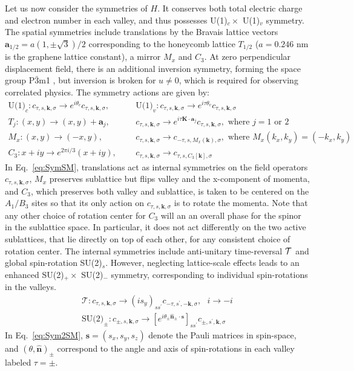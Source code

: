 \documentclass[aps,pra,twocolumn,superscriptaddress,10pt,article,nofootinbib,showpacs,longbibliography]{revtex4-1}
\def \k{{\mathbf k}}
\def \n{{\mathbf n}}
\def \s{{\mathbf s}}
\def \K{{\mathbf K}}
\def \beq{\begin{eqnarray}}
\def \eeq{\end{eqnarray}}
\def \nn{\nonumber \\}
\begin{document}
Let us now consider the symmetries of $H$. It conserves both total electric charge and electron number in each valley, and thus possesses U(1)$_c \times$ U(1)$_v$ symmetry.
The spatial symmetries include translations by the Bravais lattice vectors $\bm{a}_{1/2} = a(1, \pm \sqrt{3})/2$ corresponding to the honeycomb lattice $T_{1/2}$ ($a = 0.246$ nm is the graphene lattice constant), a mirror $M_x$ and $C_3$. 
At zero perpendicular displacement field, there is an additional inversion symmetry, forming the space group P$\bar{3}$m1 \cite{Latil,Cvetkovic}, but inversion is broken for $u \neq 0$, which is required for observing correlated physics. 
The symmetry actions are given by:
\beq
\text{U(1)}_c: c_{\tau,s,\k,\sigma} \to e^{i \theta_c} c_{\tau,s,\k,\sigma}, && ~~~ \textrm{U(1)}_v: c_{\tau,s,\k,\sigma} \to e^{i \tau \theta_v} c_{\tau,s,\k,\sigma} \nn
T_{j}: (x,y) \to (x,y) + \bm{a}_{j}, && ~~~ c_{\tau,s,\k,\sigma} \to e^{i \tau \K \cdot \bm{a}_{j}} c_{\tau,s,\k,\sigma} , \text{ where } j = 1 \text{ or } 2\nn
M_x: (x,y) \to (-x,y), && ~~~ c_{\tau,s,\k,\sigma} \to c_{-\tau,s,M_x(\k),\sigma}, \text{ where } M_x(k_x,k_y) = (-k_x, k_y) \nn
C_3: x + i y \to e^{2\pi i/3}(x + iy) , && ~~~ c_{\tau,s,\k,\sigma} \to c_{\tau,s,C_3[\k],\sigma} 
\label{eq:SymSM} 
\eeq
In Eq.~\eqref{eq:SymSM}, translations act as internal symmetries on the field operators $c_{\tau,s,\k,\sigma}$, $M_x$ preserves sublattice but flips valley and the x-component of momenta, and $C_3$, which preserves both valley and sublattice, is taken to be centered on the $A_1/B_3$ sites so that its only action on $c_{\tau,s,\k,\sigma}$ is to rotate the momenta. Note that any other choice of rotation center for $C_3$ will an an overall phase for the spinor in the sublattice space.
In particular, it does not act differently on the two active sublattices, that lie directly on top of each other, for any consistent choice of rotation center.
The internal symmetries include anti-unitary time-reversal $\cal{T}$ and global spin-rotation SU(2)$_s$. 
However, neglecting lattice-scale effects leads to an enhanced SU(2)$_+\times$ SU(2)$_-$ symmetry, corresponding to individual spin-rotations in the valleys.
\beq
\mathcal{T}: c_{\tau,s,\k,\sigma} \to (is_y)_{s s^\prime} c_{-\tau,s^\prime,-\k,\sigma}, ~~~ i \to -i \nn
\text{SU(2)}_{\pm}: c_{\pm,s,\k,\sigma} \to [e^{i \theta_\pm \hat{\n}_\pm \cdot \s}]_{s s^\prime} c_{\pm,s^\prime,\k,\sigma}
\label{eq:Sym2SM} 
\eeq
In Eq.~\eqref{eq:Sym2SM}, $\s = (s_x, s_y, s_z)$ denote the Pauli matrices in spin-space, and $(\theta, \hat{\n})_\pm$ correspond to the angle and axis of spin-rotations in each valley labeled $\tau = \pm$.
\end{document}
